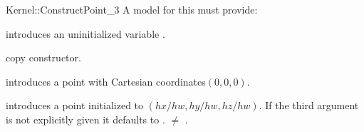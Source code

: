 \begin{ccRefFunctionObjectConcept}{Kernel::ConstructPoint_3}
A model for this must provide:


\ccHidden {}
             {introduces an uninitialized variable .}

\ccHidden {}
            {copy constructor.}

            {introduces a point with Cartesian coordinates$(0,0,0)$.}

\ccHidden{}
            {introduces a point  initialized to $(hx/hw,hy/hw, hz/hw)$.
             If the third argument is not explicitly given it defaults
             to .
             \ccPrecond {} $\neq$ . }

\ccSeeAlso
{} \\

\end{ccRefFunctionObjectConcept}
